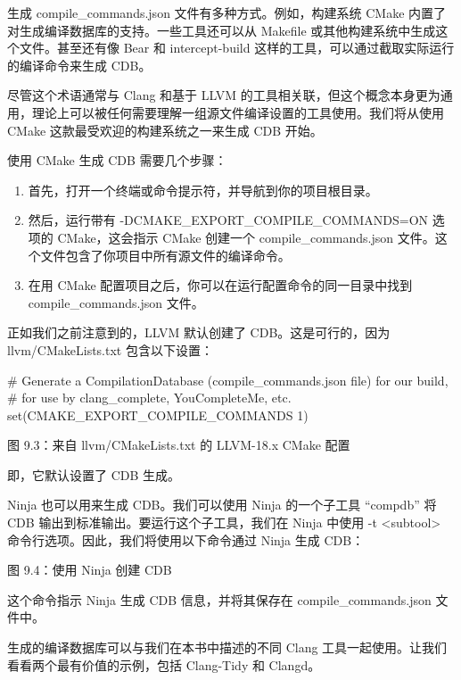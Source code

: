 生成 compile\_commands.json 文件有多种方式。例如，构建系统 CMake 内置了对生成编译数据库的支持。一些工具还可以从 Makefile 或其他构建系统中生成这个文件。甚至还有像 Bear 和 intercept-build 这样的工具，可以通过截取实际运行的编译命令来生成 CDB。

尽管这个术语通常与 Clang 和基于 LLVM 的工具相关联，但这个概念本身更为通用，理论上可以被任何需要理解一组源文件编译设置的工具使用。我们将从使用 CMake 这款最受欢迎的构建系统之一来生成 CDB 开始。


使用 CMake 生成 CDB 需要几个步骤：

\begin{enumerate}
\item
首先，打开一个终端或命令提示符，并导航到你的项目根目录。

\item
然后，运行带有 -DCMAKE\_EXPORT\_COMPILE\_COMMANDS=ON 选项的 CMake，这会指示 CMake 创建一个 compile\_commands.json 文件。这个文件包含了你项目中所有源文件的编译命令。

\item
在用 CMake 配置项目之后，你可以在运行配置命令的同一目录中找到 compile\_commands.json 文件。
\end{enumerate}

正如我们之前注意到的，LLVM 默认创建了 CDB。这是可行的，因为 llvm/CMakeLists.txt 包含以下设置：

\begin{cmake}
# Generate a CompilationDatabase (compile_commands.json file) for our build,
# for use by clang_complete, YouCompleteMe, etc.
set(CMAKE_EXPORT_COMPILE_COMMANDS 1)
\end{cmake}

\begin{center}
图 9.3：来自 llvm/CMakeLists.txt 的 LLVM-18.x CMake 配置
\end{center}

即，它默认设置了 CDB 生成。


Ninja 也可以用来生成 CDB。我们可以使用 Ninja 的一个子工具 “compdb” 将 CDB 输出到标准输出。要运行这个子工具，我们在 Ninja 中使用 -t <subtool> 命令行选项。因此，我们将使用以下命令通过 Ninja 生成 CDB：


\begin{center}
图 9.4：使用 Ninja 创建 CDB
\end{center}

这个命令指示 Ninja 生成 CDB 信息，并将其保存在 compile\_commands.json 文件中。

生成的编译数据库可以与我们在本书中描述的不同 Clang 工具一起使用。让我们看看两个最有价值的示例，包括 Clang-Tidy 和 Clangd。










